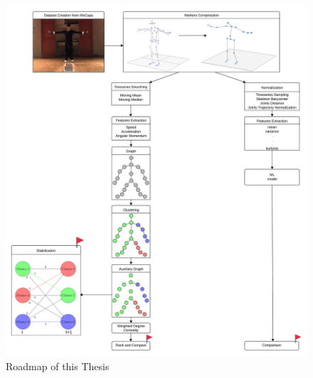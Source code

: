 \begin{figure}[H]
    \centering
    \includegraphics[width=\textwidth]{graphics/Walkthrough.png}
    \caption{Roadmap of this Thesis}
    \label{fig:walktrough}
\end{figure}